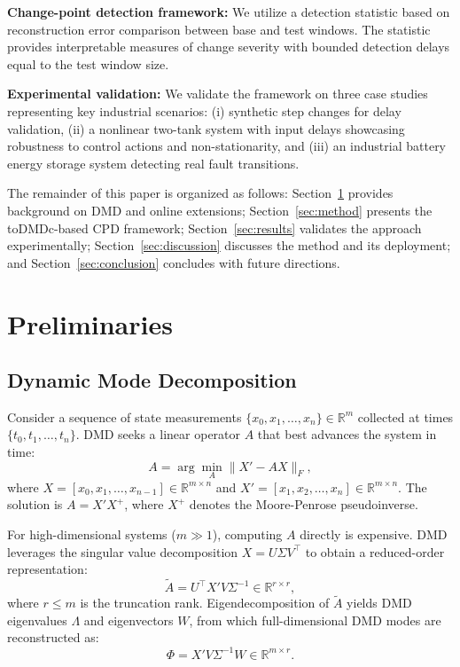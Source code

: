 \documentclass[conference]{IEEEtran}
\begin{document}
\textbf{Change-point detection framework:} We utilize a detection statistic based on reconstruction error comparison between base and test windows. The statistic provides interpretable measures of change severity with bounded detection delays equal to the test window size.

\textbf{Experimental validation:} We validate the framework on three case studies representing key industrial scenarios: (i) synthetic step changes for delay validation, (ii) a nonlinear two-tank system with input delays showcasing robustness to control actions and non-stationarity, and (iii) an industrial battery energy storage system detecting real fault transitions.

The remainder of this paper is organized as follows: Section~\ref{sec:preliminaries} provides background on DMD and online extensions; Section~\ref{sec:method} presents the toDMDc-based CPD framework; Section~\ref{sec:results} validates the approach experimentally; Section~\ref{sec:discussion} discusses the method and its deployment; and Section~\ref{sec:conclusion} concludes with future directions.

\section{Preliminaries}\label{sec:preliminaries}

\subsection{Dynamic Mode Decomposition}

Consider a sequence of state measurements \(\{x_0, x_1, \ldots, x_n\} \in \mathbb{R}^m\) collected at times \(\{t_0, t_1, \ldots, t_n\}\). DMD seeks a linear operator \(A\) that best advances the system in time:
\begin{equation}\label{eq:dmd-objective}
    A = \arg\min_A \|X' - AX\|_F,
\end{equation}
where \(X = [x_0, x_1, \ldots, x_{n-1}] \in \mathbb{R}^{m \times n}\) and \(X' = [x_1, x_2, \ldots, x_n] \in \mathbb{R}^{m \times n}\). The solution is \(A = X' X^+\), where \(X^+\) denotes the Moore-Penrose pseudoinverse.

For high-dimensional systems (\(m \gg 1\)), computing \(A\) directly is expensive. DMD leverages the singular value decomposition \(X = U\Sigma V^\top\) to obtain a reduced-order representation:
\begin{equation}\label{eq:reduced-dmd}
    \tilde{A} = U^\top X' V \Sigma^{-1} \in \mathbb{R}^{r \times r},
\end{equation}
where \(r \leq m\) is the truncation rank. Eigendecomposition of \(\tilde{A}\) yields DMD eigenvalues \(\Lambda\) and eigenvectors \(W\), from which full-dimensional DMD modes are reconstructed as:
\begin{equation}
    \Phi = X' V \Sigma^{-1} W \in \mathbb{R}^{m \times r}.
\end{equation}
\end{document}
